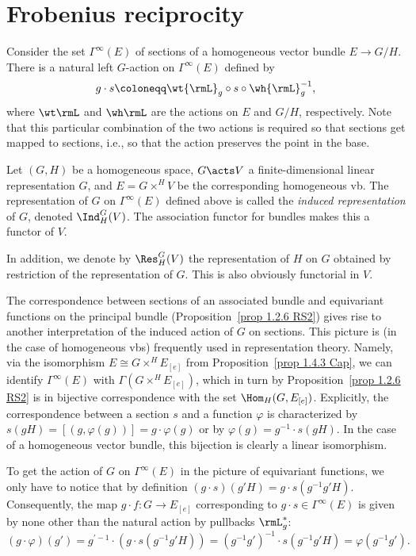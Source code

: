 \section{Frobenius reciprocity}\label{sec: Frobenius reciprocity}

Consider the set $\Gamma^\infty(E)$ of sections of a homogeneous vector bundle $E\to G\slash H$. There is a natural left $G$-action on $\Gamma^\infty(E)$ defined by
\[g\cdot s\coloneqq \wt{\rmL}_g\circ s\circ\wh{\rmL}^{-1}_g,\]
where $\wt \rmL$ and $\wh \rmL$ are the actions on $E$ and $G\slash H$, respectively. Note that this particular combination of the two actions is required so that sections get mapped to sections, i.e., so that the action preserves the point in the base.

\begin{defn}
    Let $(G,H)$ be a homogeneous space, $G\acts V$ a finite-dimensional linear representation $G$, and $E=G\times^H V$ be the corresponding homogeneous \gls{vb}. The representation of $G$ on $\Gamma^\infty(E)$ defined above is called the \emph{induced representation} of $G$, denoted $\Ind^G_H(V)$. The association functor for bundles makes this a functor of $V$.

    In addition, we denote by $\Res^G_H(V)$ the representation of $H$ on $G$ obtained by restriction of the representation of $G$. This is also obviously functorial in $V$.
\end{defn}

The correspondence between sections of an associated bundle and equivariant functions on the principal bundle (Proposition~\ref{prop 1.2.6 RS2}) gives rise to another interpretation of the induced action of $G$ on sections. This picture is (in the case of homogeneous \glspl{vb}) frequently used in representation theory. Namely, via the isomorphism $E\cong G\times^H E_{[e]}$ from Proposition~\ref{prop 1.4.3 Cap}, we can identify $\Gamma^\infty(E)$ with $\Gamma\left(G\times^H E_{[e]}\right)$, which in turn by Proposition~\ref{prop 1.2.6 RS2} is in bijective correspondence with the set $\Hom_H(G,E_{[e]})$. Explicitly, the correspondence between a section $s$ and a function $\varphi$ is characterized by $s(gH)=[(g,\varphi(g))]=g\cdot \varphi(g)$ or by $\varphi(g)=g^{-1}\cdot s(gH)$. In the case of a homogeneous vector bundle, this bijection is clearly a linear isomorphism.

To get the action of $G$ on $\Gamma^\infty(E)$ in the picture of equivariant functions, we only have to notice that by definition $(g\cdot  s)(g'H)=g\cdot  s(g^{-1}g'H)$. Consequently, the map $g\cdot f:G\to E_{[e]}$ corresponding to $g\cdot s\in \Gamma^\infty(E)$ is given by none other than the natural action by pullbacks $\rmL_g^\ast$:
\[(g\cdot \varphi)(g')=g^{\prime-1}\cdot(g\cdot s(g^{-1}g'H))=(g^{-1}g')^{-1}\cdot s(g^{-1}g'H)=\varphi(g^{-1}g').\]

